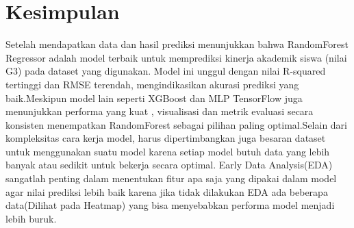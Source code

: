 \chapter*{Kesimpulan}

Setelah mendapatkan data dan hasil prediksi menunjukkan bahwa RandomForest Regressor adalah model terbaik untuk memprediksi kinerja akademik 
siswa (nilai G3) pada dataset yang digunakan. Model ini unggul dengan nilai R-squared tertinggi dan RMSE terendah, mengindikasikan akurasi 
prediksi yang baik.Meskipun model lain seperti XGBoost dan MLP TensorFlow juga menunjukkan performa yang kuat
, visualisasi dan metrik evaluasi secara konsisten menempatkan RandomForest sebagai pilihan paling optimal.Selain dari kompleksitas cara kerja  model, harus 
dipertimbangkan juga besaran dataset untuk menggunakan suatu model karena setiap model butuh data yang lebih banyak atau sedikit untuk bekerja secara optimal.
Early Data Analysis(EDA) sangatlah penting dalam menentukan fitur apa saja yang dipakai dalam model agar nilai prediksi lebih baik karena jika tidak 
dilakukan EDA ada beberapa data(Dilihat pada Heatmap) yang bisa menyebabkan performa model menjadi lebih buruk.

